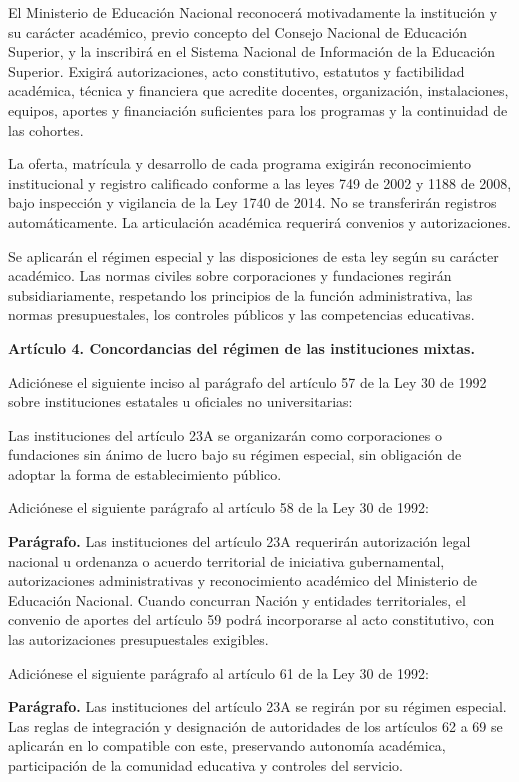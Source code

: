 \begin{mdframed}[linewidth=0.6pt,linecolor=gray!60,backgroundcolor=gray!3,
  innertopmargin=10pt,innerbottommargin=10pt,innerleftmargin=10pt,innerrightmargin=10pt]
El Ministerio de Educación Nacional reconocerá motivadamente la institución y su carácter académico, previo concepto del Consejo Nacional de Educación Superior, y la inscribirá en el Sistema Nacional de Información de la Educación Superior. Exigirá autorizaciones, acto constitutivo, estatutos y factibilidad académica, técnica y financiera que acredite docentes, organización, instalaciones, equipos, aportes y financiación suficientes para los programas y la continuidad de las cohortes.

La oferta, matrícula y desarrollo de cada programa exigirán reconocimiento institucional y registro calificado conforme a las leyes 749 de 2002 y 1188 de 2008, bajo inspección y vigilancia de la Ley 1740 de 2014. No se transferirán registros automáticamente. La articulación académica requerirá convenios y autorizaciones.

Se aplicarán el régimen especial y las disposiciones de esta ley según su carácter académico. Las normas civiles sobre corporaciones y fundaciones regirán subsidiariamente, respetando los principios de la función administrativa, las normas presupuestales, los controles públicos y las competencias educativas.

\textbf{Artículo 4. Concordancias del régimen de las instituciones mixtas.}

Adiciónese el siguiente inciso al parágrafo del artículo 57 de la Ley 30 de 1992 sobre instituciones estatales u oficiales no universitarias:

Las instituciones del artículo 23A se organizarán como corporaciones o fundaciones sin ánimo de lucro bajo su régimen especial, sin obligación de adoptar la forma de establecimiento público.

Adiciónese el siguiente parágrafo al artículo 58 de la Ley 30 de 1992:

\textbf{Parágrafo.} Las instituciones del artículo 23A requerirán autorización legal nacional u ordenanza o acuerdo territorial de iniciativa gubernamental, autorizaciones administrativas y reconocimiento académico del Ministerio de Educación Nacional. Cuando concurran Nación y entidades territoriales, el convenio de aportes del artículo 59 podrá incorporarse al acto constitutivo, con las autorizaciones presupuestales exigibles.

Adiciónese el siguiente parágrafo al artículo 61 de la Ley 30 de 1992:

\textbf{Parágrafo.} Las instituciones del artículo 23A se regirán por su régimen especial. Las reglas de integración y designación de autoridades de los artículos 62 a 69 se aplicarán en lo compatible con este, preservando autonomía académica, participación de la comunidad educativa y controles del servicio.


\end{mdframed}
